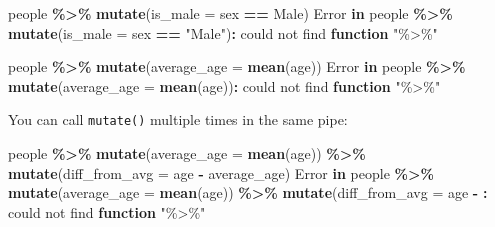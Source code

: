\documentclass[
]{book}
\newenvironment{Shaded}{\begin{snugshade}}{\end{snugshade}}
\newcommand{\AttributeTok}[1]{\textcolor[rgb]{0.13,0.29,0.53}{#1}}
\newcommand{\ControlFlowTok}[1]{\textcolor[rgb]{0.13,0.29,0.53}{\textbf{#1}}}
\newcommand{\ErrorTok}[1]{\textcolor[rgb]{0.64,0.00,0.00}{\textbf{#1}}}
\newcommand{\FunctionTok}[1]{\textcolor[rgb]{0.13,0.29,0.53}{\textbf{#1}}}
\newcommand{\NormalTok}[1]{#1}
\newcommand{\SpecialCharTok}[1]{\textcolor[rgb]{0.81,0.36,0.00}{\textbf{#1}}}
\newcommand{\StringTok}[1]{\textcolor[rgb]{0.31,0.60,0.02}{#1}}
\begin{document}
\begin{Shaded}
\begin{Highlighting}[]
\NormalTok{people }\SpecialCharTok{\%\textgreater{}\%} \FunctionTok{mutate}\NormalTok{(}\AttributeTok{is\_male =}\NormalTok{ sex }\SpecialCharTok{==} \StringTok{\textquotesingle{}Male\textquotesingle{}}\NormalTok{)}
\NormalTok{Error }\ControlFlowTok{in}\NormalTok{ people }\SpecialCharTok{\%\textgreater{}\%} \FunctionTok{mutate}\NormalTok{(}\AttributeTok{is\_male =}\NormalTok{ sex }\SpecialCharTok{==} \StringTok{"Male"}\NormalTok{)}\SpecialCharTok{:}\NormalTok{ could not find }\ControlFlowTok{function} \StringTok{"\%\textgreater{}\%"}
\end{Highlighting}
\end{Shaded}

\begin{Shaded}
\begin{Highlighting}[]
\NormalTok{people }\SpecialCharTok{\%\textgreater{}\%} \FunctionTok{mutate}\NormalTok{(}\AttributeTok{average\_age =} \FunctionTok{mean}\NormalTok{(age))}
\NormalTok{Error }\ControlFlowTok{in}\NormalTok{ people }\SpecialCharTok{\%\textgreater{}\%} \FunctionTok{mutate}\NormalTok{(}\AttributeTok{average\_age =} \FunctionTok{mean}\NormalTok{(age))}\SpecialCharTok{:}\NormalTok{ could not find }\ControlFlowTok{function} \StringTok{"\%\textgreater{}\%"}
\end{Highlighting}
\end{Shaded}

You can call \texttt{mutate()} multiple times in the same pipe:

\begin{Shaded}
\begin{Highlighting}[]
\NormalTok{people }\SpecialCharTok{\%\textgreater{}\%} \FunctionTok{mutate}\NormalTok{(}\AttributeTok{average\_age =} \FunctionTok{mean}\NormalTok{(age)) }\SpecialCharTok{\%\textgreater{}\%}
  \FunctionTok{mutate}\NormalTok{(}\AttributeTok{diff\_from\_avg =}\NormalTok{ age }\SpecialCharTok{{-}}\NormalTok{ average\_age)}
\NormalTok{Error }\ControlFlowTok{in}\NormalTok{ people }\SpecialCharTok{\%\textgreater{}\%} \FunctionTok{mutate}\NormalTok{(}\AttributeTok{average\_age =} \FunctionTok{mean}\NormalTok{(age)) }\SpecialCharTok{\%\textgreater{}\%} \FunctionTok{mutate}\NormalTok{(}\AttributeTok{diff\_from\_avg =}\NormalTok{ age }\SpecialCharTok{{-}} \ErrorTok{:}\NormalTok{ could not find }\ControlFlowTok{function} \StringTok{"\%\textgreater{}\%"}
\end{Highlighting}
\end{Shaded}
\end{document}
